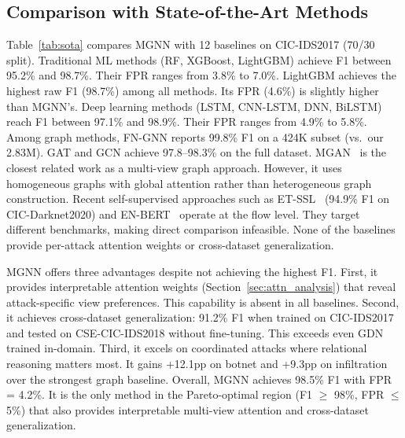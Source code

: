 \documentclass[conference]{IEEEtran}
\begin{document}
\subsection{Comparison with State-of-the-Art Methods}
Table~\ref{tab:sota} compares MGNN with 12 baselines on CIC-IDS2017 (70/30 split). Traditional ML methods (RF, XGBoost, LightGBM) achieve F1 between 95.2\% and 98.7\%. Their FPR ranges from 3.8\% to 7.0\%. LightGBM achieves the highest raw F1 (98.7\%) among all methods. Its FPR (4.6\%) is slightly higher than MGNN's. Deep learning methods (LSTM, CNN-LSTM, DNN, BiLSTM) reach F1 between 97.1\% and 98.9\%. Their FPR ranges from 4.9\% to 5.8\%. Among graph methods, FN-GNN reports 99.8\% F1 on a 424K subset (vs.\ our 2.83M). GAT and GCN achieve 97.8--98.3\% on the full dataset. MGAN~\cite{akpaku2025mgan} is the closest related work as a multi-view graph approach. However, it uses homogeneous graphs with global attention rather than heterogeneous graph construction. Recent self-supervised approaches such as ET-SSL~\cite{sattar2025etssl} (94.9\% F1 on CIC-Darknet2020) and EN-BERT~\cite{liu2025enbert} operate at the flow level. They target different benchmarks, making direct comparison infeasible. None of the baselines provide per-attack attention weights or cross-dataset generalization.\par
MGNN offers three advantages despite not achieving the highest F1. First, it provides interpretable attention weights (Section~\ref{sec:attn_analysis}) that reveal attack-specific view preferences. This capability is absent in all baselines. Second, it achieves cross-dataset generalization: 91.2\% F1 when trained on CIC-IDS2017 and tested on CSE-CIC-IDS2018 without fine-tuning. This exceeds even GDN trained in-domain. Third, it excels on coordinated attacks where relational reasoning matters most. It gains +12.1pp on botnet and +9.3pp on infiltration over the strongest graph baseline. Overall, MGNN achieves 98.5\% F1 with FPR = 4.2\%. It is the only method in the Pareto-optimal region (F1 $\ge$ 98\%, FPR $\le$ 5\%) that also provides interpretable multi-view attention and cross-dataset generalization.
\end{document}
